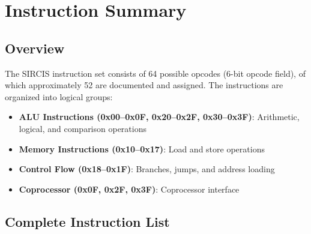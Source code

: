 \chapter{Instruction Summary}
\label{ch:instruction-summary}

\section{Overview}

The SIRCIS instruction set consists of 64 possible opcodes (6-bit opcode field), of which approximately 52 are
documented and assigned. The instructions are organized into logical groups:

\begin{itemize}
	\item \textbf{ALU Instructions (0x00--0x0F, 0x20--0x2F, 0x30--0x3F)}: Arithmetic, logical, and comparison operations
	\item \textbf{Memory Instructions (0x10--0x17)}: Load and store operations
	\item \textbf{Control Flow (0x18--0x1F)}: Branches, jumps, and address loading
	\item \textbf{Coprocessor (0x0F, 0x2F, 0x3F)}: Coprocessor interface
\end{itemize}

\section{Complete Instruction List}

